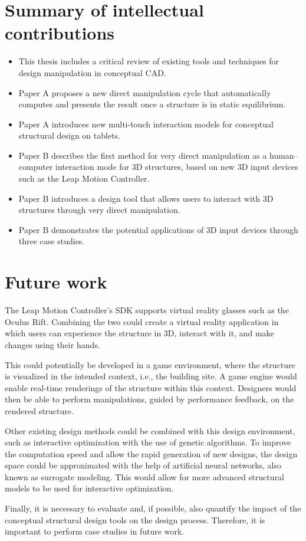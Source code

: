 \section{Summary of intellectual contributions}
\begin{itemize} 
\item This thesis includes a critical review of existing tools and techniques for design manipulation in conceptual CAD.
\item Paper A proposes a new direct manipulation cycle that automatically computes and presents the result once a structure is in static equilibrium.
\item Paper A introduces new multi-touch interaction models for conceptual structural design on tablets.
\item Paper B describes the first method for very direct manipulation as a human--computer interaction mode for 3D structures, based on new 3D input devices such as the Leap Motion Controller.
\item Paper B introduces a design tool that allows users to interact with 3D structures through very direct manipulation.
\item Paper B demonstrates the potential applications of 3D input devices through three case studies.
\end{itemize} 


\section{Future work}
The Leap Motion Controller’s SDK supports virtual reality glasses such as the Oculus Rift. Combining the two could create a virtual reality application in which users can experience the structure in 3D, interact with it, and make changes using their hands. 

This could potentially be developed in a game environment, where the structure is visualized in the intended context, i.e., the building site. A game engine would enable real-time renderings of the structure within this context. Designers would then be able to perform manipulations, guided by performance feedback, on the rendered structure. 

Other existing design methods could be combined with this design environment, such as interactive optimization with the use of genetic algorithms. To improve the computation speed and allow the rapid generation of new designs, the design space could be approximated with the help of artificial neural networks, also known as surrogate modeling. This would allow for more advanced structural models to be used for interactive optimization.

Finally, it is necessary to evaluate and, if possible, also quantify the impact of the conceptual structural design tools on the design process. Therefore, it is important to perform case studies in future work.

